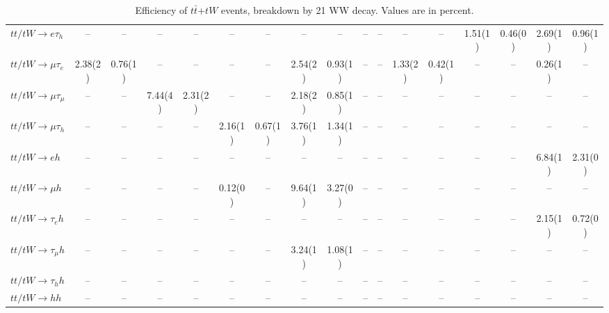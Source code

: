 \begin{sidewaystable}[p]
\begin{tabular}{|l|cc|cc|cc|cc|cc|cc|cc|cc|}
    $tt/tW \to e\tau_{h}$              &    --    &    --    &    --    &    --    &    --    &    --    &    --    &    --    &    --    &    --    &    --    &    --    &  1.51(1) &  0.46(0) &  2.69(1) &  0.96(1) \\ 
    $tt/tW \to \mu\tau_{e}$            &  2.38(2) &  0.76(1) &    --    &    --    &    --    &    --    &  2.54(2) &  0.93(1) &    --    &    --    &  1.33(2) &  0.42(1) &    --    &    --    &  0.26(1) &    --    \\ 
    $tt/tW \to \mu\tau_{\mu}$          &    --    &    --    &  7.44(4) &  2.31(2) &    --    &    --    &  2.18(2) &  0.85(1) &    --    &    --    &    --    &    --    &    --    &    --    &    --    &    --    \\ 
    $tt/tW \to \mu\tau_{h}$            &    --    &    --    &    --    &    --    &  2.16(1) &  0.67(1) &  3.76(1) &  1.34(1) &    --    &    --    &    --    &    --    &    --    &    --    &    --    &    --    \\ 
    $tt/tW \to eh$                     &    --    &    --    &    --    &    --    &    --    &    --    &    --    &    --    &    --    &    --    &    --    &    --    &    --    &    --    &  6.84(1) &  2.31(0) \\ 
    $tt/tW \to \mu h$                  &    --    &    --    &    --    &    --    &  0.12(0) &    --    &  9.64(1) &  3.27(0) &    --    &    --    &    --    &    --    &    --    &    --    &    --    &    --    \\ 
    $tt/tW \to \tau_{e}h$              &    --    &    --    &    --    &    --    &    --    &    --    &    --    &    --    &    --    &    --    &    --    &    --    &    --    &    --    &  2.15(1) &  0.72(0) \\ 
    $tt/tW \to \tau_{\mu}h$            &    --    &    --    &    --    &    --    &    --    &    --    &  3.24(1) &  1.08(1) &    --    &    --    &    --    &    --    &    --    &    --    &    --    &    --    \\ 
    $tt/tW \to \tau_{h}h$              &    --    &    --    &    --    &    --    &    --    &    --    &    --    &    --    &    --    &    --    &    --    &    --    &    --    &    --    &    --    &    --    \\ 
    $tt/tW \to hh$                     &    --    &    --    &    --    &    --    &    --    &    --    &    --    &    --    &    --    &    --    &    --    &    --    &    --    &    --    &    --    &    --    \\ 

    \hline
    \end{tabular}
    \caption{Efficiency of $t\bar{t}$+$tW$ events, breakdown by 21 WW decay.  Values are in percent.}
    \label{sigcomp}
    
\end{sidewaystable}
